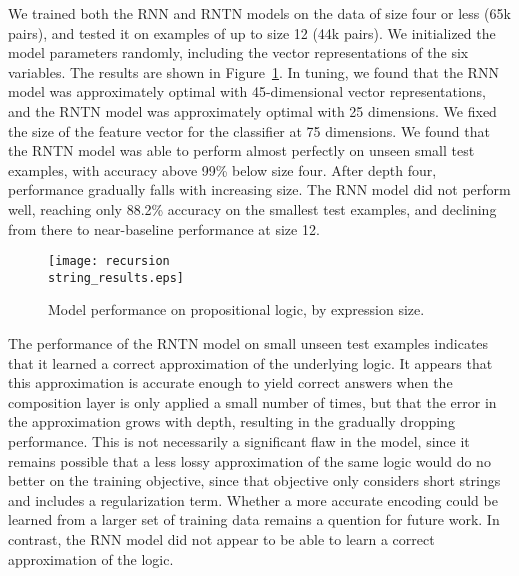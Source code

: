 We trained both the RNN and RNTN models on the data of size four or
less (65k pairs), and tested it on examples of up to size 12 (44k
pairs). We initialized the model parameters randomly, including the
vector representations of the six variables. The results are shown in
Figure~\ref{prop-results}. In tuning, we found that the RNN model was
approximately optimal with 45-dimensional vector representations, and
the RNTN model was approximately optimal with 25 dimensions. We fixed
the size of the feature vector for the classifier at 75 dimensions. We
found that the RNTN model was able to perform almost perfectly on
unseen small test examples, with accuracy above 99\% below size four.
After depth four, performance gradually falls with increasing size.
The RNN model did not perform well, reaching only 88.2\% accuracy on
the smallest test examples, and declining from there to near-baseline
performance at size 12.

\begin{figure}[htp]
  \centering
  \texttt{[image: recursion\\string\_results.eps]}
  \caption{Model performance on propositional logic, by expression size.}  
  \label{prop-results}
\end{figure}

The performance of the RNTN model on small unseen test examples
indicates that it learned a correct approximation of the underlying
logic. It appears that this approximation is accurate enough to yield
correct answers when the composition layer is only applied a small
number of times, but that the error in the approximation grows with
depth, resulting in the gradually dropping performance. This is not
necessarily a significant flaw in the model, since it remains possible
that a less lossy approximation of the same logic would do no better
on the training objective, since that objective only considers short
strings and includes a regularization term. Whether a more accurate
encoding could be learned from a larger set of training data remains a
quention for future work. In contrast, the RNN model did not appear to
be able to learn a correct approximation of the logic.

